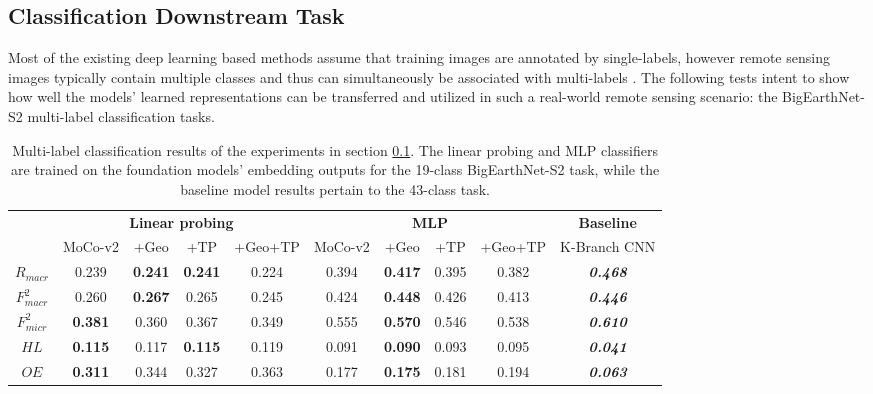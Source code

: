 \subsection{Classification Downstream Task}
\label{sec:classification}
Most of the existing deep learning based methods assume that training images are annotated by single-labels, however remote sensing images typically contain multiple classes and thus
can simultaneously be associated with multi-labels \cite{benchmark}. The following tests intent to show how well the models' learned representations can be transferred and utilized in such a real-world remote sensing scenario: the BigEarthNet-S2 multi-label classification tasks.

\begin{table}[h]
\centering
\begin{tabular}{c|cccc|cccc|c}
& \multicolumn{4}{|c|}{\textbf{Linear probing}} & \multicolumn{4}{|c|}{\textbf{MLP}} & \textbf{Baseline} \\
& MoCo-v2 & +Geo & +TP & +Geo+TP & MoCo-v2 & +Geo & +TP & +Geo+TP & K-Branch CNN \\ \hline
$R_{macr}$ & 0.239 & \textbf{0.241} & \textbf{0.241} & 0.224 & 0.394 & \textbf{0.417} & 0.395 & 0.382 & \textit{\textbf{0.468}} \\
$F^2_{macr}$ & 0.260 & \textbf{0.267} & 0.265 & 0.245 & 0.424 & \textbf{0.448} & 0.426 & 0.413 & \textit{\textbf{0.446}} \\
$F^2_{micr}$ & \textbf{0.381} & 0.360 & 0.367 & 0.349 & 0.555 & \textbf{0.570} & 0.546 & 0.538 & \textit{\textbf{0.610}} \\
$HL$ & \textbf{0.115} & 0.117 & \textbf{0.115} & 0.119 & 0.091 & \textbf{0.090} & 0.093 & 0.095 & \textit{\textbf{0.041}} \\
$OE$ & \textbf{0.311}& 0.344 & 0.327 & 0.363 & 0.177 & \textbf{0.175} & 0.181 & 0.194 & \textit{\textbf{0.063}} \\
\end{tabular}
\caption{Multi-label classification results of the experiments in section \ref{sec:classification}. The linear probing and MLP classifiers are trained on the foundation models' embedding outputs for the 19-class BigEarthNet-S2 task, while the baseline model results pertain to the 43-class task.}
\label{tab:classification}
\end{table}

